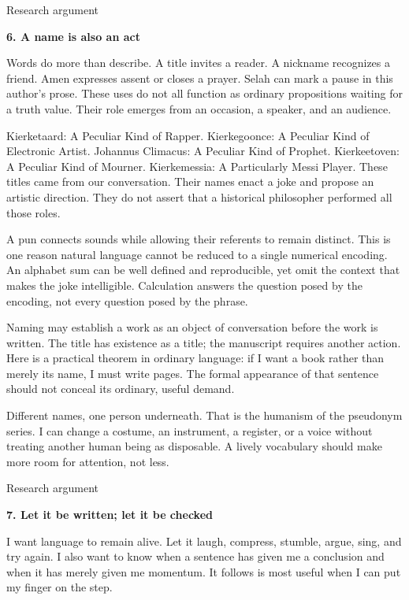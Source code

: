 \documentclass[10pt]{article}
\begin{document}
\clearpage
{\small\color{accent}Research argument}\par
{\LARGE\bfseries\color{ink}6. A name is also an act}\par\vspace{7pt}
Words do more than describe. A title invites a reader. A nickname recognizes a friend. Amen expresses assent or closes a prayer. Selah can mark a pause in this author's prose. These uses do not all function as ordinary propositions waiting for a truth value. Their role emerges from an occasion, a speaker, and an audience.\par
Kierketaard: A Peculiar Kind of Rapper. Kierkegoonce: A Peculiar Kind of Electronic Artist. Johannus Climacus: A Peculiar Kind of Prophet. Kierkeetoven: A Peculiar Kind of Mourner. Kierkemessia: A Particularly Messi Player. These titles came from our conversation. Their names enact a joke and propose an artistic direction. They do not assert that a historical philosopher performed all those roles.\par
A pun connects sounds while allowing their referents to remain distinct. This is one reason natural language cannot be reduced to a single numerical encoding. An alphabet sum can be well defined and reproducible, yet omit the context that makes the joke intelligible. Calculation answers the question posed by the encoding, not every question posed by the phrase.\par
Naming may establish a work as an object of conversation before the work is written. The title has existence as a title; the manuscript requires another action. Here is a practical theorem in ordinary language: if I want a book rather than merely its name, I must write pages. The formal appearance of that sentence should not conceal its ordinary, useful demand.\par
Different names, one person underneath. That is the humanism of the pseudonym series. I can change a costume, an instrument, a register, or a voice without treating another human being as disposable. A lively vocabulary should make more room for attention, not less.\par
\clearpage
{\small\color{accent}Research argument}\par
{\LARGE\bfseries\color{ink}7. Let it be written; let it be checked}\par\vspace{7pt}
I want language to remain alive. Let it laugh, compress, stumble, argue, sing, and try again. I also want to know when a sentence has given me a conclusion and when it has merely given me momentum. It follows is most useful when I can put my finger on the step.\par
\end{document}
